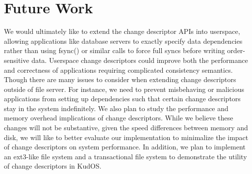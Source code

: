 \preparagraphspacing{}
\section*{Future Work}
\label{sec:future}

We would ultimately like to extend the change descriptor APIs into
userspace, allowing applications like database servers to exactly
specify data dependencies rather than using fsync() or similar calls
to force full syncs before writing order-sensitive data. Userspace
change descriptors could improve both the performance and correctness
of applications requiring complicated consistency semantics. Though
there are many issues to consider when extending change descriptors
outside of file server. For instance, we need to prevent misbehaving
or malicious applications from setting up dependencies such that
certain change descriptors stay in the system indefinitely. We also
plan to study the performance and memory overhead implications of
change descriptors. While we believe these changes will not be
substantive, given the speed differences between memory and disk,
we will like to better evaluate our implementation to minimalize the
impact of change descriptors on system performance. In addition, we
plan to implement an ext3-like file system and a transactional file
system to demonstrate the utility of change descriptors in KudOS.

